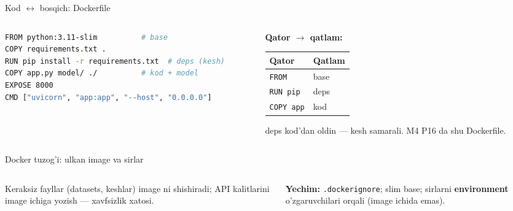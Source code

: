 \documentclass[aspectratio=169,11pt]{beamer}
\begin{document}
\begin{frame}[fragile]{Kod $\leftrightarrow$ bosqich: Dockerfile}
  \begin{columns}[T]
    \begin{column}{0.58\textwidth}
\begin{lstlisting}[language=bash]
FROM python:3.11-slim          # base
COPY requirements.txt .
RUN pip install -r requirements.txt  # deps (kesh)
COPY app.py model/ ./          # kod + model
EXPOSE 8000
CMD ["uvicorn", "app:app", "--host", "0.0.0.0"]
\end{lstlisting}
    \end{column}
    \begin{column}{0.38\textwidth}
      \textbf{Qator $\to$ qatlam:}\\[3pt]
      \footnotesize
      \begin{tabular}{p{1.7cm}p{2.0cm}}
        \toprule
        Qator & Qatlam \\
        \midrule
        \texttt{FROM} & base \\
        \texttt{RUN pip} & deps \\
        \texttt{COPY app} & kod \\
        \bottomrule
      \end{tabular}
      \vspace{4pt}
      \begin{tcolorbox}[okbox,top=2pt,bottom=2pt]
        \footnotesize
        deps kod'dan oldin --- kesh samarali. M4 P16 da shu Dockerfile.
      \end{tcolorbox}
    \end{column}
  \end{columns}
\end{frame}

\begin{frame}{Docker tuzog'i: ulkan image va sirlar}
  \begin{columns}[T]
    \begin{column}{0.52\textwidth}
      \begin{tcolorbox}[warnbox,title={Katta va xavfli image}]
        \small
        Keraksiz fayllar (datasets, keshlar) image ni shishiradi; API kalitlarini
        image ichiga yozish --- xavfsizlik xatosi.
      \end{tcolorbox}
    \end{column}
    \begin{column}{0.44\textwidth}
      \begin{tcolorbox}[okbox,top=2pt,bottom=2pt]
        \footnotesize
        \textbf{Yechim:} \texttt{.dockerignore}; slim base; sirlarni
        \textbf{environment} o'zgaruvchilari orqali (image ichida emas).
      \end{tcolorbox}
    \end{column}
  \end{columns}
\end{frame}
\end{document}
